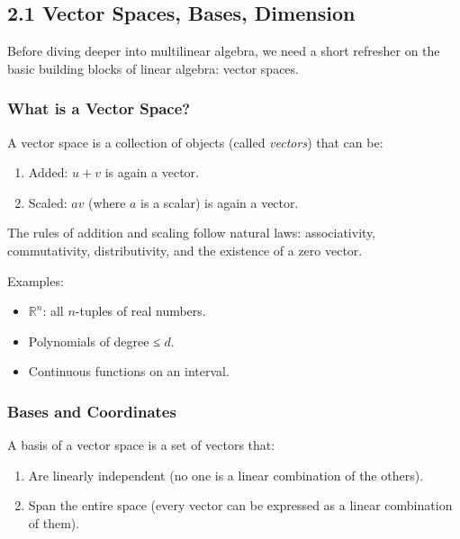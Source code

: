 \documentclass[
  letterpaper,
  DIV=11,
  numbers=noendperiod]{scrreprt}
\providecommand{\tightlist}{%
  \setlength{\itemsep}{0pt}\setlength{\parskip}{0pt}}
\begin{document}
\subsection{2.1 Vector Spaces, Bases,
Dimension}\label{vector-spaces-bases-dimension}

Before diving deeper into multilinear algebra, we need a short refresher
on the basic building blocks of linear algebra: vector spaces.

\subsubsection{What is a Vector Space?}\label{what-is-a-vector-space}

A vector space is a collection of objects (called \emph{vectors}) that
can be:

\begin{enumerate}
\def\labelenumi{\arabic{enumi}.}
\tightlist
\item
  Added: \(u + v\) is again a vector.
\item
  Scaled: \(a v\) (where \(a\) is a scalar) is again a vector.
\end{enumerate}

The rules of addition and scaling follow natural laws: associativity,
commutativity, distributivity, and the existence of a zero vector.

Examples:

\begin{itemize}
\tightlist
\item
  \(\mathbb{R}^n\): all \(n\)-tuples of real numbers.
\item
  Polynomials of degree ≤ \(d\).
\item
  Continuous functions on an interval.
\end{itemize}

\subsubsection{Bases and Coordinates}\label{bases-and-coordinates}

A basis of a vector space is a set of vectors that:

\begin{enumerate}
\def\labelenumi{\arabic{enumi}.}
\tightlist
\item
  Are linearly independent (no one is a linear combination of the
  others).
\item
  Span the entire space (every vector can be expressed as a linear
  combination of them).
\end{enumerate}
\end{document}
